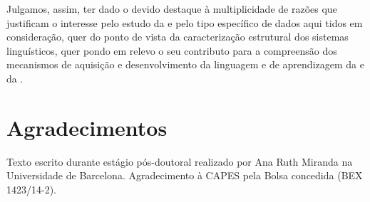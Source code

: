 \documentclass[output=paper]{LSP/langsci}
\begin{document}
Julgamos, assim, ter dado o devido destaque à multiplicidade de razões que justificam o interesse pelo estudo da  e pelo tipo específico de dados aqui tidos em consideração, quer do ponto de vista da caracterização estrutural dos sistemas linguísticos, quer pondo em relevo o seu contributo para a compreensão dos mecanismos de aquisição e desenvolvimento da linguagem e de aprendizagem da  e da .

\section*{Agradecimentos}
Texto escrito durante estágio pós-doutoral realizado por Ana Ruth Miranda na Universidade de Barcelona. Agradecimento à CAPES pela Bolsa concedida (BEX 1423/14-2).

{\sloppy
\printbibliography[heading=subbibliography,notkeyword=this]
}
\end{document}

